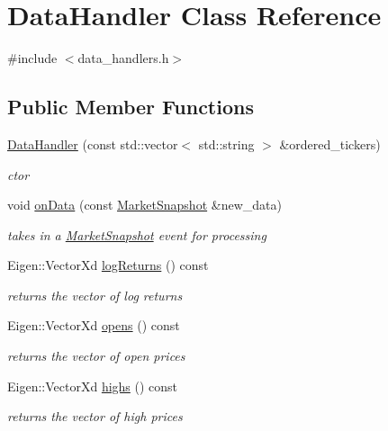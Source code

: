 \hypertarget{classDataHandler}{}\section{Data\+Handler Class Reference}
\label{classDataHandler}


{\ttfamily \#include $<$data\+\_\+handlers.\+h$>$}

\subsection*{Public Member Functions}
\begin{DoxyCompactItemize}
\item 
\hyperlink{classDataHandler_a754e8043d3c0249833f9bf47dcfff4cd}{Data\+Handler} (const std\+::vector$<$ std\+::string $>$ \&ordered\+\_\+tickers)
\begin{DoxyCompactList}\small\item\em ctor \end{DoxyCompactList}\item 
void \hyperlink{classDataHandler_af90bc55472239836a8d071710356ceb7}{on\+Data} (const \hyperlink{classMarketSnapshot}{Market\+Snapshot} \&new\+\_\+data)
\begin{DoxyCompactList}\small\item\em takes in a \hyperlink{classMarketSnapshot}{Market\+Snapshot} event for processing \end{DoxyCompactList}\item 
Eigen\+::\+Vector\+Xd \hyperlink{classDataHandler_aed9c495d5134beaf1c796d5f828de229}{log\+Returns} () const
\begin{DoxyCompactList}\small\item\em returns the vector of log returns \end{DoxyCompactList}\item 
Eigen\+::\+Vector\+Xd \hyperlink{classDataHandler_a56ff111f68c862739bd94c193abdf400}{opens} () const
\begin{DoxyCompactList}\small\item\em returns the vector of open prices \end{DoxyCompactList}\item 
Eigen\+::\+Vector\+Xd \hyperlink{classDataHandler_a94ccb9422f3f7d50ad07c3a0553baab9}{highs} () const
\begin{DoxyCompactList}\small\item\em returns the vector of high prices \end{DoxyCompactList}\item 

\end{DoxyCompactItemize}
